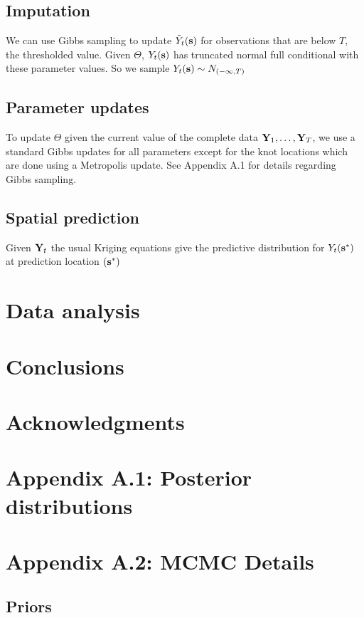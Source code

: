 \documentclass[11pt]{article}
\begin{document}
\subsection{Imputation}\label{s:impute}
We can use Gibbs sampling to update ${\tilde Y}_t(\mbox{\bf s})$ for observations that are below $T$, the thresholded value. Given $\Theta$, $Y_t(\mbox{\bf s})$ has truncated normal full conditional with these parameter values.
So we sample $Y_t(\mbox{\bf s}) \sim N_{(-\infty, T)}$

\subsection{Parameter updates}\label{s:params}
To update $\Theta$ given the current value of the complete data $\mbox{\bf Y}_1, \ldots, \mbox{\bf Y}_T$, we use a standard Gibbs updates for all parameters except for the knot locations which are done using a Metropolis update.
See Appendix A.1 for details regarding Gibbs sampling.

\subsection{Spatial prediction}\label{s:pred}
Given $\mbox{\bf Y}_t$ the usual Kriging equations give the predictive distribution for $Y_t(\mbox{\bf s}^*)$ at prediction location $(\mbox{\bf s}^*)$


\section{Data analysis}\label{s:analysis}


\section{Conclusions}\label{s:con}

\section*{Acknowledgments}

\section*{Appendix A.1: Posterior distributions}





\section*{Appendix A.2: MCMC Details}

\subsection*{Priors}





\end{document}
